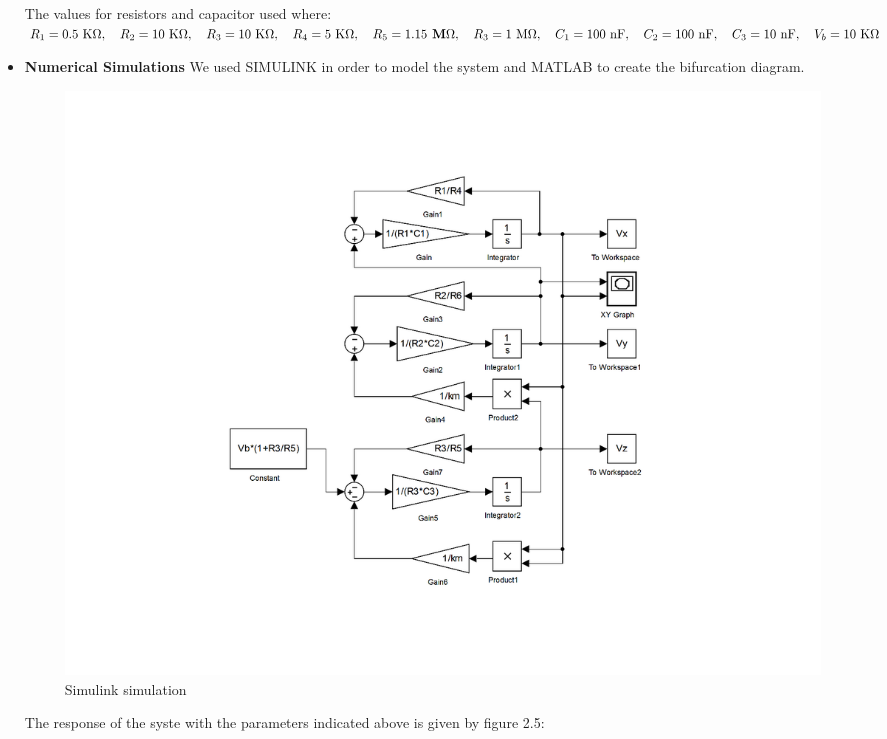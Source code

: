 \begin{itemize}
The values for resistors and capacitor used where: $R_1=0.5\text{ K}\Omega, \quad R_2=10\text{ K}\Omega, \quad R_3=10\text{ K}\Omega, \quad R_4=5\text{ K}\Omega, \quad R_5=1.15\textbf{\text{ M}}\Omega, \quad R_3=1\text{ M}\Omega, \quad C_1=100\text{ nF}, \quad C_2=100\text{ nF}, \quad C_3=10\text{ nF}, \quad V_b=10\text{ K}\Omega$
   \item \textbf{Numerical Simulations}
We used SIMULINK in order to model the system and MATLAB to create the bifurcation diagram.
            \begin{figure}[H]
            \centering
            \includegraphics[scale=0.4]{imagenes/2-benford/shilkinovsimu.png}
            \caption{Simulink simulation}
            \end{figure}
The response of the syste with the parameters indicated above is given by figure 2.5:


\end{itemize}
